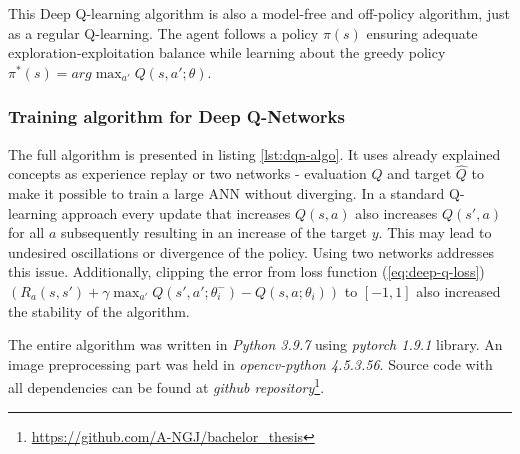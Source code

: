 This Deep Q-learning algorithm is also a model-free and off-policy algorithm, just as a regular Q-learning. The agent follows a policy $\pi(s)$
ensuring adequate exploration-exploitation balance while learning about the greedy policy $\pi^*(s) = arg\max_{a'}Q(s, a'; \theta)$.

\subsubsection*{Training algorithm for Deep Q-Networks}
\label{sub2:training-algo-for-deep-q-net}

The full algorithm is presented in listing \ref{lst:dqn-algo}. It uses already explained concepts as experience replay or two networks - evaluation $Q$ and
target $\hat{Q}$ to make it possible to train a large ANN without diverging. In a standard Q-learning approach every update that increases $Q(s,
a)$ also increases $Q(s', a)$ for all $a$ subsequently resulting in an increase of the target $y$. This may lead to undesired oscillations or
divergence of the policy. Using two networks addresses this issue. Additionally, clipping the error from loss function (\ref{eq:deep-q-loss})
$\left(R_a(s, s') + \gamma \max_{a'} Q(s', a'; \theta^-_i) - Q(s, a; \theta_i) \right)$ to $[-1, 1]$ also increased the stability of the algorithm.

The entire algorithm was written in \emph{Python 3.9.7} using \emph{pytorch 1.9.1} library. An image preprocessing part was held in \emph{opencv-python 4.5.3.56}. Source code with all dependencies can be found at \emph{github
repository}\footnote{\url{https://github.com/A-NGJ/bachelor_thesis}}.

